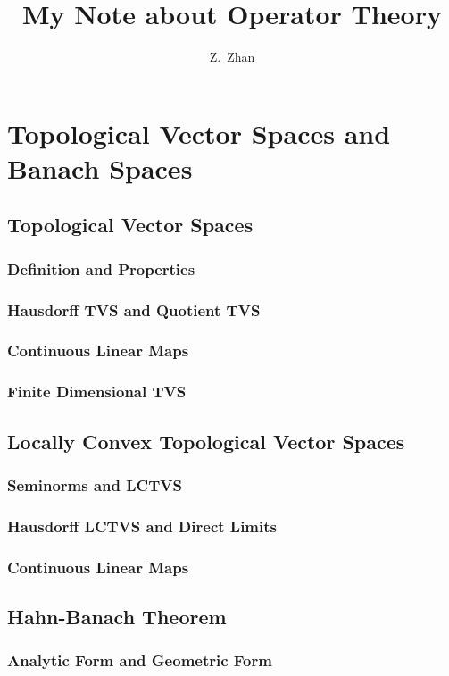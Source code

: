 \documentclass[a4paper, 11pt]{report}
\author{Z.~Zhan}
\title{My Note about Operator Theory}
\begin{document}
	
	\maketitle
	\tableofcontents

	\chapter{Topological Vector Spaces and Banach Spaces}

	\section{Topological Vector Spaces}
	\subsection{Definition and Properties}
	\subsection{Hausdorff TVS and Quotient TVS}
	\subsection{Continuous Linear Maps}
	\subsection{Finite Dimensional TVS}

	\section{Locally Convex Topological Vector Spaces}
	\subsection{Seminorms and LCTVS}
	\subsection{Hausdorff LCTVS and Direct Limits}
	\subsection{Continuous Linear Maps}

	\section{Hahn-Banach Theorem}
	\subsection{Analytic Form and Geometric Form}
\end{document}
